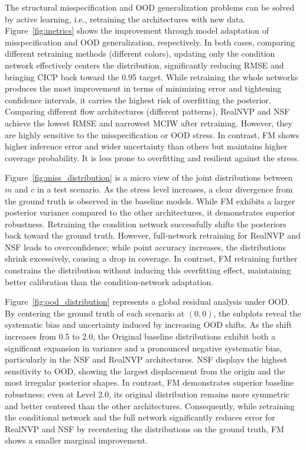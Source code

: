 The structural misspecification and \ac{OOD} generalization problems can be solved by active learning, i.e., retraining the architectures with new data. Figure~\ref{fig:metrics} shows the improvement through model adaptation of misspecification and \ac{OOD} generalization, respectively. In both cases, comparing different retraining methods (different colors), updating only the condition network effectively centers the distribution, significantly reducing RMSE and bringing CICP back toward the 0.95 target. While retraining the whole networks produces the most improvement in terms of minimizing error and tightening confidence intervals, it carries the highest risk of overfitting the posterior. Comparing different flow architectures (different patterns), RealNVP and NSF achieve the lowest RMSE and narrowest MCIW after retraining. However, they are highly sensitive to the misspecification or \ac{OOD} stress. In contrast, FM shows higher inference error and wider uncertainty than others but maintains higher coverage probability. It is less prone to overfitting and resilient against the stress.

Figure~\ref{fig:miss_distribution} is a micro view of the joint distributions between $m$ and $c$ in a test scenario. As the stress level increases, a clear divergence from the ground truth is observed in the baseline models. While FM exhibits a larger posterior variance compared to the other architectures, it demonstrates superior robustness. Retraining the condition network successfully shifts the posteriors back toward the ground truth. However, full-network retraining for RealNVP and NSF leads to overconfidence; while point accuracy increases, the distributions shrink excessively, causing a drop in coverage. In contrast, FM retraining further constrains the distribution without inducing this overfitting effect, maintaining better calibration than the condition-network adaptation.

Figure~\ref{fig:ood_distribution} represents a global residual analysis under OOD. By centering the ground truth of each scenario at $(0,0)$, the subplots reveal the systematic bias and uncertainty induced by increasing \ac{OOD} shifts. As the shift increases from 0.5 to 2.0, the Original baseline distributions exhibit both a significant expansion in variance and a pronounced negative systematic bias, particularly in the NSF and RealNVP architectures. NSF displays the highest sensitivity to \ac{OOD}, showing the largest displacement from the origin and the most irregular posterior shapes. In contrast, FM demonstrates superior baseline robustness; even at Level 2.0, its original distribution remains more symmetric and better centered than the other architectures. Consequently, while retraining the conditional network and the full network significantly reduces error for RealNVP and NSF by recentering the distributions on the ground truth, FM shows a smaller marginal improvement. 


